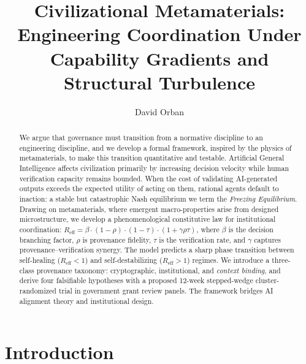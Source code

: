 \documentclass[runningheads]{llncs}
\begin{document}
\title{Civilizational Metamaterials: Engineering Coordination Under Capability Gradients and Structural Turbulence}

\author{David Orban}



\maketitle

\begin{abstract}
We argue that governance must transition from a normative discipline to an engineering discipline, and we develop a formal framework, inspired by the physics of metamaterials, to make this transition quantitative and testable. Artificial General Intelligence affects civilization primarily by increasing decision velocity while human verification capacity remains bounded. When the cost of validating AI-generated outputs exceeds the expected utility of acting on them, rational agents default to inaction: a stable but catastrophic Nash equilibrium we term the \emph{Freezing Equilibrium}. Drawing on metamaterials, where emergent macro-properties arise from designed microstructure, we develop a phenomenological constitutive law for institutional coordination: $R_{\mathrm{eff}} = \beta \cdot (1-\rho) \cdot (1-\tau) \cdot (1+\gamma \rho \tau)$, where $\beta$ is the decision branching factor, $\rho$ is provenance fidelity, $\tau$ is the verification rate, and $\gamma$ captures provenance--verification synergy. The model predicts a sharp phase transition between self-healing ($R_{\mathrm{eff}} < 1$) and self-destabilizing ($R_{\mathrm{eff}} > 1$) regimes. We introduce a three-class provenance taxonomy: cryptographic, institutional, and \emph{context binding}, and derive four falsifiable hypotheses with a proposed 12-week stepped-wedge cluster-randomized trial in government grant review panels. The framework bridges AI alignment theory and institutional design.

\end{abstract}


\section{Introduction}
\label{sec:intro}
\end{document}
